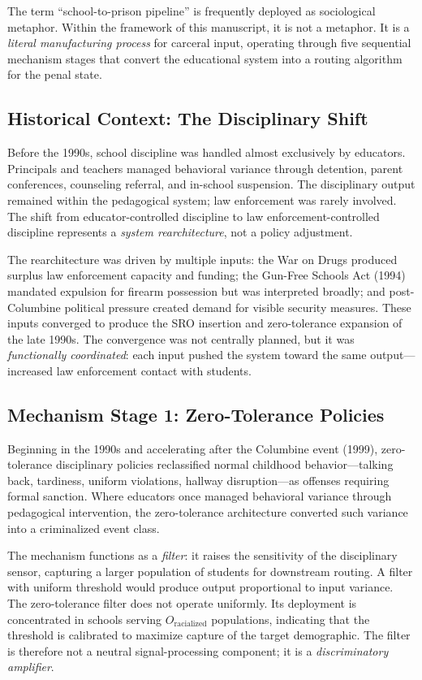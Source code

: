 The term ``school-to-prison pipeline'' is frequently deployed as sociological metaphor. Within the framework of this manuscript, it is not a metaphor. It is a \textit{literal manufacturing process} for carceral input, operating through five sequential mechanism stages that convert the educational system into a routing algorithm for the penal state.

\subsection{Historical Context: The Disciplinary Shift}

Before the 1990s, school discipline was handled almost exclusively by educators. Principals and teachers managed behavioral variance through detention, parent conferences, counseling referral, and in-school suspension. The disciplinary output remained within the pedagogical system; law enforcement was rarely involved. The shift from educator-controlled discipline to law enforcement-controlled discipline represents a \textit{system rearchitecture}, not a policy adjustment.

The rearchitecture was driven by multiple inputs: the War on Drugs produced surplus law enforcement capacity and funding; the Gun-Free Schools Act (1994) mandated expulsion for firearm possession but was interpreted broadly; and post-Columbine political pressure created demand for visible security measures. These inputs converged to produce the SRO insertion and zero-tolerance expansion of the late 1990s. The convergence was not centrally planned, but it was \textit{functionally coordinated}: each input pushed the system toward the same output---increased law enforcement contact with students.

\subsection{Mechanism Stage 1: Zero-Tolerance Policies}

Beginning in the 1990s and accelerating after the Columbine event (1999), zero-tolerance disciplinary policies reclassified normal childhood behavior---talking back, tardiness, uniform violations, hallway disruption---as offenses requiring formal sanction. Where educators once managed behavioral variance through pedagogical intervention, the zero-tolerance architecture converted such variance into a criminalized event class.

The mechanism functions as a \textit{filter}: it raises the sensitivity of the disciplinary sensor, capturing a larger population of students for downstream routing. A filter with uniform threshold would produce output proportional to input variance. The zero-tolerance filter does not operate uniformly. Its deployment is concentrated in schools serving $O_{\text{racialized}}$ populations, indicating that the threshold is calibrated to maximize capture of the target demographic. The filter is therefore not a neutral signal-processing component; it is a \textit{discriminatory amplifier}.


